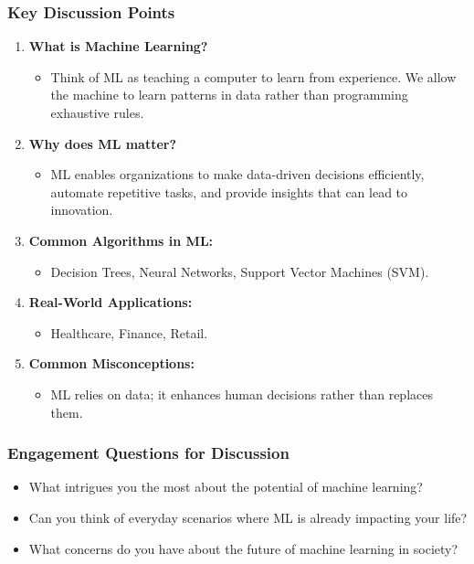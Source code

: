 \documentclass[aspectratio=169]{beamer}
\begin{document}
\begin{frame}[fragile]
    \frametitle{Key Discussion Points}
    \begin{enumerate}
        \item \textbf{What is Machine Learning?}
            \begin{itemize}
                \item Think of ML as teaching a computer to learn from experience. We allow the machine to learn patterns in data rather than programming exhaustive rules.
            \end{itemize}
        \item \textbf{Why does ML matter?}
            \begin{itemize}
                \item ML enables organizations to make data-driven decisions efficiently, automate repetitive tasks, and provide insights that can lead to innovation.
            \end{itemize}
        \item \textbf{Common Algorithms in ML:}
            \begin{itemize}
                \item Decision Trees, Neural Networks, Support Vector Machines (SVM).
            \end{itemize}
        \item \textbf{Real-World Applications:}
            \begin{itemize}
                \item Healthcare, Finance, Retail.
            \end{itemize}
        \item \textbf{Common Misconceptions:}
            \begin{itemize}
                \item ML relies on data; it enhances human decisions rather than replaces them.
            \end{itemize}
    \end{enumerate}
\end{frame}

\begin{frame}[fragile]
    \frametitle{Engagement Questions for Discussion}
    \begin{itemize}
        \item What intrigues you the most about the potential of machine learning?
        \item Can you think of everyday scenarios where ML is already impacting your life?
        \item What concerns do you have about the future of machine learning in society?
    \end{itemize}
\end{frame}
\end{document}
